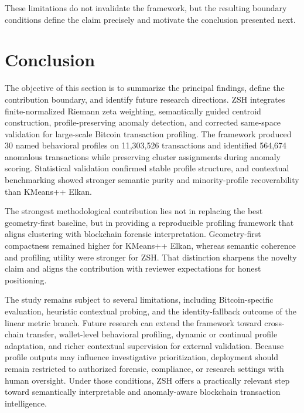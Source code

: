 \documentclass{ieeeaccess}
\begin{document}
These limitations do not invalidate the framework, but the resulting boundary conditions define the claim precisely and motivate the conclusion presented next.

\section{Conclusion}

The objective of this section is to summarize the principal findings, define the contribution boundary, and identify future research directions. ZSH integrates finite-normalized Riemann zeta weighting, semantically guided centroid construction, profile-preserving anomaly detection, and corrected same-space validation for large-scale Bitcoin transaction profiling. The framework produced 30 named behavioral profiles on 11,303,526 transactions and identified 564,674 anomalous transactions while preserving cluster assignments during anomaly scoring. Statistical validation confirmed stable profile structure, and contextual benchmarking showed stronger semantic purity and minority-profile recoverability than KMeans++ Elkan.

The strongest methodological contribution lies not in replacing the best geometry-first baseline, but in providing a reproducible profiling framework that aligns clustering with blockchain forensic interpretation. Geometry-first compactness remained higher for KMeans++ Elkan, whereas semantic coherence and profiling utility were stronger for ZSH. That distinction sharpens the novelty claim and aligns the contribution with reviewer expectations for honest positioning.

The study remains subject to several limitations, including Bitcoin-specific evaluation, heuristic contextual probing, and the identity-fallback outcome of the linear metric branch. Future research can extend the framework toward cross-chain transfer, wallet-level behavioral profiling, dynamic or continual profile adaptation, and richer contextual supervision for external validation. Because profile outputs may influence investigative prioritization, deployment should remain restricted to authorized forensic, compliance, or research settings with human oversight. Under those conditions, ZSH offers a practically relevant step toward semantically interpretable and anomaly-aware blockchain transaction intelligence.
\end{document}
